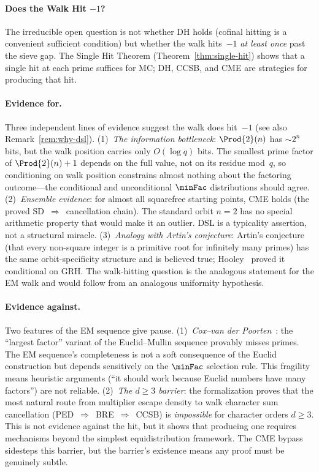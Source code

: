\paragraph{Does the Walk Hit $-1$?}

The irreducible open question is not whether DH holds (cofinal
hitting is a convenient sufficient condition) but whether the walk
hits~$-1$ \emph{at least once} past the sieve gap.  The Single Hit
Theorem (Theorem~\ref{thm:single-hit}) shows that a single hit at
each prime suffices for MC; DH, CCSB, and CME are strategies for
producing that hit.

\paragraph{Evidence for.}
Three independent lines of evidence suggest the walk does hit~$-1$
(see also Remark~\ref{rem:why-dsl}).
(1)~\emph{The information bottleneck}: $\Prod{2}(n)$ has
${\sim}2^n$ bits, but the walk position carries only $O(\log q)$ bits.
The smallest prime factor of $\Prod{2}(n)+1$ depends on the full
value, not on its residue mod~$q$, so conditioning on walk position
constrains almost nothing about the factoring outcome---the
conditional and unconditional $\minFac$ distributions should agree.
(2)~\emph{Ensemble evidence}: for almost all squarefree starting
points, CME holds (the proved SD~$\Rightarrow$~cancellation chain).
The standard orbit $n = 2$ has no special arithmetic property that
would make it an outlier.  DSL is a typicality assertion, not a
structural miracle.
(3)~\emph{Analogy with Artin's conjecture}: Artin's conjecture
(that every non-square integer is a primitive root for infinitely
many primes) has the same orbit-specificity structure and is believed
true; Hooley~\cite{Hooley1967} proved it conditional on GRH.  The
walk-hitting question is the analogous statement for the EM walk
and would follow from an analogous uniformity hypothesis.

\paragraph{Evidence against.}
Two features of the EM sequence give pause.
(1)~\emph{Cox--van der Poorten}~\cite{CoxVdP1968}: the ``largest factor'' variant of
the Euclid--Mullin sequence provably misses primes.  The EM
sequence's completeness is not a soft consequence of the Euclid
construction but depends sensitively on the $\minFac$ selection
rule.  This fragility means heuristic arguments
(``it should work because Euclid numbers have many factors'') are
not reliable.
(2)~\emph{The $d \geq 3$ barrier}: the formalization proves that
the most natural route from multiplier escape density to walk
character sum cancellation (PED~$\Rightarrow$~BRE~$\Rightarrow$~CCSB) is
\emph{impossible} for character orders $d \geq 3$.  This is not
evidence against the hit, but it shows that producing one
requires mechanisms beyond the simplest equidistribution
framework.  The CME bypass sidesteps this barrier, but the barrier's
existence means any proof must be genuinely subtle.

